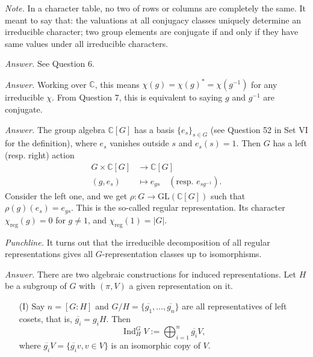 \documentclass{mathproblems}
\newcommand\C{\mathbb{C}}
\newcommand\GL{\mathrm{GL}}
\DeclareMathOperator{\Ind}{Ind}
\begin{document}
\begin{questions}
\textit{Note.} In a character table, no two of rows or columns are completely the same. It meant to say that: the valuations at all conjugacy classes uniquely determine an irreducible character; two group elements are conjugate if and only if they have same values under all irreducible characters.


\textit{Answer.} See Question 6.


\textit{Answer.} Working over $\C$, this means $\chi(g)=\chi(g)^*=\chi(g^{-1})$ for any irreducible $\chi$. From Question 7, this is equivalent to saying $g$ and $g^{-1}$ are conjugate.


\textit{Answer.} The group algebra $\C[G]$ has a basis $\{e_s\}_{s\in G}$ (see Question 52 in Set VI for the definition), where $e_s$ vanishes outside $s$ and $e_s(s)=1$. Then $G$ has a left (resp. right) action
$$
\begin{aligned}
G\times \C[G] & \longrightarrow \C[G]\\
(g,e_s) & \longmapsto e_{g s} \quad (\text{resp. } e_{s g^{-1}}).
\end{aligned}
$$
Consider the left one, and we get $\rho: G\to \GL(\C[G])$ such that $\rho(g)(e_s)=e_{g s}$. This is the so-called regular representation. Its character $\chi_{\mathrm{reg}}(g)=0$ for $g\neq 1$, and $\chi_{\mathrm{reg}}(1)=|G|$.

\textit{Punchline.} It turns out that the irreducible decomposition of all regular representations gives all $G$-representation classes up to isomorphisms.


\textit{Answer.} There are two algebraic constructions for induced representations. Let $H$ be a subgroup of $G$ with $(\pi,V)$ a given representation on it.
\begin{itemize}
\item[(I)] Say $n=[G:H]$ and $G/H=\{\overline{g_1},\ldots,\overline{g_n}\}$ are all representatives of left cosets, that is, $\overline{g_i}=g_i H$. Then
$$
\Ind_H^G V:=\bigoplus_{i=1}^n \overline{g_i} V,
$$
where $\overline{g_i}V=\{\overline{g_i}v, v\in V\}$ is an isomorphic copy of $V$.


\end{itemize}
\end{questions}
\end{document}
